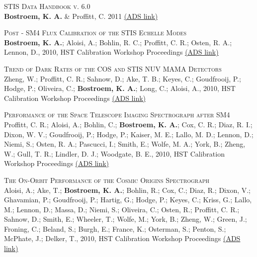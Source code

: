 \begin{revnumerate}[24]
\item{\textsc{STIS Data Handbook v. 6.0}\\
{\bf Bostroem, K. A.} \& Proffitt, C. 2011
\color{blue}\href{https://ui.adsabs.harvard.edu/#abs/2011stis.book.....B/abstract}{(ADS link)}\color{black}}\\

\item{\textsc{Post - SM4 Flux Calibration of the STIS Echelle Modes}\\
\textbf{Bostroem, K. A.}; Aloisi, A.; Bohlin, R. C.; Proffitt, C. R.; Osten, R. A.; Lennon, D., 2010, HST Calibration Workshop Proceedings
\color{blue}\href{https://ui.adsabs.harvard.edu/#abs/2010hstc.workE..51B/abstract}{(ADS link)}\color{black}}\\%

\item{\textsc{Trend of Dark Rates of the COS and STIS NUV MAMA Detectors}\\
Zheng, W.; Proffitt, C. R.; Sahnow, D.; Ake, T. B.; Keyes, C.; Goudfrooij, P.; Hodge, P.; Oliveira, C.; \textbf{Bostroem, K. A.}; Long, C.; Aloisi, A., 2010, HST Calibration Workshop Proceedings 
\color{blue}\href{https://ui.adsabs.harvard.edu/#abs/2010hstc.workE..47Z/abstract}{(ADS link)}\color{black}}\\

\item{\textsc{Performance of the Space Telescope Imaging Spectrograph after SM4}\\
Proffitt, C. R.; Aloisi, A.; Bohlin, C.; \textbf{Bostroem, K. A.}; Cox, C. R.; Diaz, R. I.; Dixon, W. V.; Goudfrooij, P.; Hodge, P.; Kaiser, M. E.; Lallo, M. D.; Lennon, D.; Niemi, S.; Osten, R. A.; Pascucci, I.; Smith, E.; Wolfe, M. A.; York, B.; Zheng, W.; Gull, T. R.; Lindler, D. J.; Woodgate, B. E., 2010, HST Calibration Workshop Proceedings
\color{blue}\href{https://ui.adsabs.harvard.edu/#abs/2010hstc.workE...6P/abstract}{(ADS link)}\color{black}}\\
\item{\textsc{The On-Orbit Performance of the Cosmic Origins Spectrograph}\\
Aloisi, A.; Ake, T.; \textbf{Bostroem, K. A.}; Bohlin, R.; Cox, C.; Diaz, R.; Dixon, V.; Ghavamian, P.; Goudfrooij, P.; Hartig, G.; Hodge, P.; Keyes, C.; Kriss, G.; Lallo, M.; Lennon, D.; Massa, D.; Niemi, S.; Oliveira, C.; Osten, R.; Proffitt, C. R.; Sahnow, D.; Smith, E.; Wheeler, T.; Wolfe, M.; York, B.; Zheng, W.; Green, J.; Froning, C.; Beland, S.; Burgh, E.; France, K.; Osterman, S.; Penton, S.; McPhate, J.; Delker, T., 2010, HST Calibration Workshop Proceedings 
\color{blue}\href{https://ui.adsabs.harvard.edu/#abs/2010hstc.workE...3A/abstract}{(ADS link)}\color{black}}\\
\end{revnumerate}
